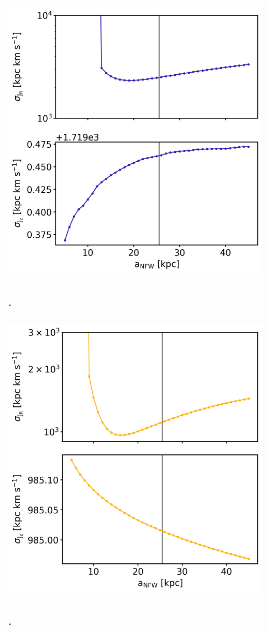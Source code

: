 \begin{figure}[b]
    \centering
	\includegraphics[width=0.6\textwidth]{plots/Dynamics/prog3/a_NFW_diagnostic_plot_std_prog3_all.png}
    \label{fig:NFW_diag_prog3}
\caption{.}
\end{figure}
\begin{figure}[b]
    \centering
	\includegraphics[width=0.6\textwidth]{plots/Dynamics/prog4/a_NFW_diagnostic_plot_std_prog4_all.png}
    \label{fig:NFW_diag_prog4}
\caption{.}
\end{figure}

